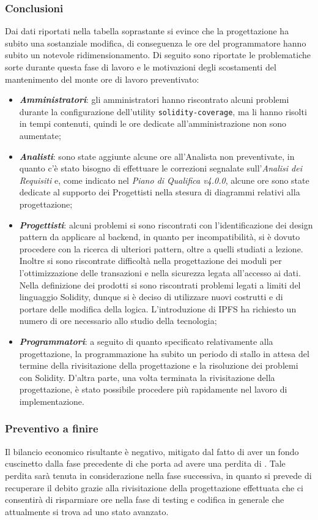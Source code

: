 {\subsubsection{Conclusioni}
Dai dati riportati nella tabella soprastante si evince che la progettazione ha subito una sostanziale modifica, di conseguenza le ore del programmatore hanno subito un notevole ridimensionamento. 
Di seguito sono riportate le problematiche sorte durante questa fase di lavoro e le motivazioni degli scostamenti del mantenimento del monte ore di 
lavoro preventivato:
\begin{itemize}
	\item \textbf{\textit{Amministratori}}: gli amministratori hanno riscontrato alcuni problemi durante la configurazione dell'utility \texttt{solidity-coverage}, ma li hanno risolti in tempi contenuti, quindi le ore dedicate all'amministrazione non sono aumentate;
	\item \textbf{\textit{Analisti}}: sono state aggiunte alcune ore all'Analista non preventivate, in quanto c'è stato bisogno di effettuare le correzioni segnalate sull'\textit{Analisi dei Requisiti} e, come indicato nel \textit{Piano di Qualifica v4.0.0}, alcune ore sono state dedicate al supporto dei Progettisti nella stesura di diagrammi relativi alla progettazione;
	\item \textbf{\textit{Progettisti}}: alcuni problemi si sono riscontrati con l'identificazione dei design pattern da applicare al backend, in quanto per incompatibilità, si è dovuto procedere con la ricerca di ulteriori pattern, oltre a quelli studiati a lezione. Inoltre si sono riscontrate difficoltà nella progettazione dei moduli per l'ottimizzazione delle transazioni e nella sicurezza legata all'accesso ai dati. Nella definizione dei prodotti si sono riscontrati problemi legati a limiti del linguaggio Solidity, dunque si è deciso di utilizzare nuovi costrutti e di portare delle modifica della logica. L'introduzione di IPFS\glo{} ha richiesto un numero di ore necessario allo studio della tecnologia;
	\item \textbf{\textit{Programmatori}}: a seguito di quanto specificato relativamente alla progettazione, la programmazione ha subito un periodo di stallo in attesa del termine della rivisitazione della progettazione e la risoluzione dei problemi con Solidity. D'altra parte, una volta terminata la rivisitazione della progettazione, è stato possibile procedere più rapidamente nel lavoro di implementazione.
\end{itemize}
\subsubsection{Preventivo a finire}
Il bilancio economico risultante è negativo, mitigato dal fatto di aver un fondo cuscinetto dalla fase precedente di  che porta ad avere una perdita di . Tale perdita sarà tenuta in considerazione nella fase successiva, in quanto si prevede di recuperare il debito grazie alla rivisitazione della progettazione effettuata che ci consentirà di risparmiare ore nella fase di testing e codifica in generale che attualmente si trova ad uno stato avanzato.
\\


}
